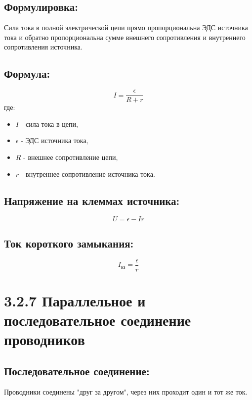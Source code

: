 \documentclass[a4paper,12pt]{article}
\begin{document}
\subsection*{Формулировка:}
\vspace{-3pt}
Сила тока в полной электрической цепи прямо пропорциональна ЭДС источника тока и обратно пропорциональна сумме внешнего сопротивления и внутреннего сопротивления источника.

\vspace{-9pt}
\subsection*{Формула:}
\vspace{-3pt}
\vspace{-0.05em}
$$ I = \frac{\epsilon}{R + r} $$
где:
\begin{itemize}
    \item $I$ - сила тока в цепи,
    \item $\epsilon$ - ЭДС источника тока,
    \item $R$ - внешнее сопротивление цепи,
    \item $r$ - внутреннее сопротивление источника тока.
\end{itemize}

\vspace{-9pt}
\subsection*{Напряжение на клеммах источника:}
\vspace{-3pt}
\vspace{-0.05em}
$$ U = \epsilon - Ir $$

\vspace{-9pt}
\subsection*{Ток короткого замыкания:}
\vspace{-3pt}
\vspace{-0.05em}
$$ I_{кз}= \frac{\epsilon}{r} $$

\newpage
\section*{3.2.7 Параллельное и последовательное соединение проводников}
\vspace{-9pt}
\subsection*{Последовательное соединение:}
\vspace{-3pt}
Проводники соединены "друг за другом", через них проходит один и тот же ток.
\end{document}
